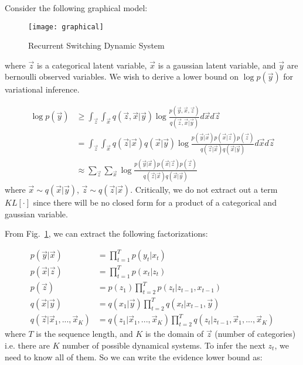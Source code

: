 \documentclass[12pt]{article}
\begin{document}
Consider the following graphical model:

\begin{figure}[h]
\centering
\texttt{[image: graphical]}
\caption{Recurrent Switching Dynamic System}
\label{mode}
\end{figure}

where $\vec{z}$ is a categorical latent variable, $\vec{x}$ is a gaussian latent variable, and $\vec{y}$ are bernoulli observed variables. We wish to derive a lower bound on $\log p(\vec{y})$ for variational inference.

\begin{align}
    \log p(\vec{y}) &\geq \int_{\vec{z}} \int_{\vec{x}} q(\vec{z},\vec{x}|\vec{y}) \log \frac{p(\vec{y},\vec{x},\vec{z})}{q(\vec{z},\vec{x}|\vec{y})} d\vec{x} d\vec{z} \\
                    &= \int_{\vec{z}} \int_{\vec{x}} q(\vec{z}|\vec{x})q(\vec{x}|\vec{y}) \log \frac{p(\vec{y}|\vec{x})p(\vec{x}|\vec{z})p(\vec{z})}{q(\vec{z}|\vec{x})q(\vec{x}|\vec{y})} d\vec{x} d\vec{z} \\
                    &\approx \sum_{\vec{z}} \sum_{\vec{x}} \log \frac{p(\vec{y}|\vec{x})p(\vec{x}|\vec{z})p(\vec{z})}{q(\vec{z}|\vec{x})q(\vec{x}|\vec{y})}
\end{align}
where $\vec{x} \sim q(\vec{x}|\vec{y})$, $\vec{z} \sim q(\vec{z}|\vec{x})$. Critically, we do not extract out a term $KL[\cdot]$ since there will be no closed form for a product of a categorical and gaussian variable.

From Fig.~\ref{mode}, we can extract the following factorizations:

\begin{align}
    p(\vec{y}|\vec{x}) &= \prod_{t=1}^{T} p(y_t|x_t) \\
    p(\vec{x}|\vec{z}) &= \prod_{t=1}^{T} p(x_t|z_t) \\
    p(\vec{z}) &= p(z_1)\prod_{t=2}^{T} p(z_t|z_{t-1},x_{t-1}) \\
    q(\vec{x}|\vec{y}) &= q(x_1|\vec{y})\prod_{t=2}^{T} q(x_t|x_{t-1},\vec{y}) \\
    q(\vec{z}|\vec{x}_1, ..., \vec{x}_K) &= q(z_1|\vec{x}_1, ..., \vec{x}_K)\prod_{t=2}^{T} q(z_t|z_{t-1},\vec{x}_1, ..., \vec{x}_K)
\end{align}
where $T$ is the sequence length, and $K$ is the domain of $\vec{z}$ (number of categories) i.e. there are $K$ number of possible dynamical systems. To infer the next $z_t$, we need to know all of them. So we can write the evidence lower bound as:
\end{document}
